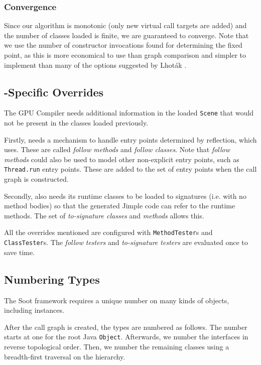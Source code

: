 \documentclass[preprint]{sigplanconf}
\begin{document}
\subsubsection{Convergence}
Since our algorithm is monotonic (only new virtual call targets are added) and the number of classes loaded is finite, we are guaranteed to converge. Note that we use the number of constructor invocations found for determining the fixed point, as this is more economical to use than graph comparison and simpler to implement than many of the options suggested by Lhoták \cite{lhot02}.

\subsection{\rb{}-Specific Overrides}
\label{sec:followtosig}

The \rb GPU Compiler needs additional information in the loaded {\tt Scene} that would not be present in the classes loaded previously.

Firstly, \rb needs a mechanism to handle entry points determined by reflection, which \rb uses. These are called \emph{follow methods} and \emph{follow classes}. Note that \emph{follow methods} could also be used to model other non-explicit entry points, such as {\tt Thread.run} entry points. These are added to the set of entry points when the call graph is constructed.

Secondly, \rb also needs its runtime classes to be loaded to signatures (i.e. with no method bodies) so that the generated Jimple code can refer to the runtime methods. The set of \emph{to-signature classes} and \emph{methods} allows this.

All the overrides mentioned are configured with {\tt MethodTester}s and {\tt ClassTester}s. The \emph{follow testers} and \emph{to-signature testers} are evaluated once to save time.

\subsection{Numbering Types}
\label{sec:numbering}
The Soot framework requires a unique number on many kinds of objects, including \sootclass instances.

After the call graph is created, the types are numbered as follows. The number starts at one for the root Java {\tt Object}. Afterwards, we number the interfaces in reverse topological order. Then, we number the remaining classes using a breadth-first traversal on the hierarchy.
\end{document}
